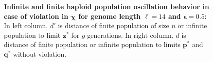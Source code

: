 \begin{figure}[h]
\begin{center}
\hspace{-3em}%
\vspace{-0.5em} \hspace{-3em}%

\caption[\textbf{Infinite and finite haploid population oscillation behavior in case of violation in $\bm{\chi}$ for genome length $\ell = 14$ and $\bm{\epsilon} = 0.5$}]{\textbf{Infinite and finite haploid population oscillation behavior in case of violation in $\bm{\chi}$ for genome length $\ell = 14$ and $\bm{\epsilon} = 0.5$:} 
  In left column, $d'$ is distance of finite population of size $n$ or infinite population to limit $\bm{z}^\ast$ for $g$ generations. In right column, $d$ is distance of finite population or infinite population to limits $\bm{p}^\ast$ and $\bm{q}^\ast$ without violation.}
\label{oscillation_14h_vio_chi_0.5}
\end{center}
\end{figure}

